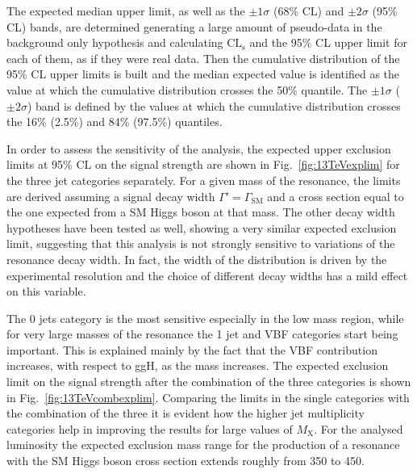 The expected median upper limit, as well as the $\pm 1\sigma$ (68\% CL) and $\pm 2\sigma$ (95\% CL) bands, are determined generating a large amount of pseudo-data in the background only hypothesis and calculating $\mathrm{CL_s}$ and the 95\% CL upper limit for each of them, as if they were real data. Then the cumulative distribution of the 95\% CL upper limits is built and the median expected value is identified as the value at which the cumulative distribution crosses the 50\% quantile. The $\pm 1\sigma$ ($\pm 2 \sigma$) band is defined by the values at which the cumulative distribution crosses the 16\% (2.5\%) and 84\% (97.5\%) quantiles.

In order to assess the sensitivity of the analysis, the expected upper exclusion limits at 95\% CL on the signal strength are shown in Fig.~\ref{fig:13TeVexplim} for the three jet categories separately. For a given mass of the resonance, the limits are derived assuming a signal decay width $\Gamma' = \Gamma_\mathrm{SM}$ and a cross section equal to the one expected from a SM Higgs boson at that mass. The other decay width hypotheses have been tested as well, showing a very similar expected exclusion limit, suggesting that this analysis is not strongly sensitive to variations of the resonance decay width. In fact, the width of the \mti distribution is driven by the experimental resolution and the choice of different decay widths has a mild effect on this variable.

The 0 jets category is the most sensitive especially in the low mass region, while for very large masses of the resonance the 1 jet and VBF categories start being important. This is explained mainly by the fact that the VBF contribution increases, with respect to ggH, as the mass increases. The expected exclusion limit on the signal strength after the combination of the three categories is shown in Fig.~\ref{fig:13TeVcombexplim}. Comparing the limits in the single categories with the combination of the three it is evident how the higher jet multiplicity categories help in improving the results for large values of $M_\mathrm{X}$. For the analysed luminosity the expected exclusion mass range for the production of a resonance with the SM Higgs boson cross section extends roughly from 350 to 450\GeV.

